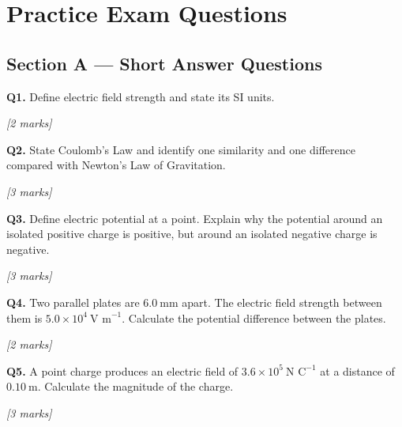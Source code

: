 \section{Practice Exam Questions}

\subsection*{Section A — Short Answer Questions}

\begin{tcolorbox}[colback=white, colframe=midblue, breakable]

\begin{minipage}{\linewidth}
\textbf{Q1.} Define electric field strength and state its SI units.
\par\hfill\textit{[2 marks]}
\vspace{2.5cm}
\end{minipage}

\begin{minipage}{\linewidth}
\textbf{Q2.} State Coulomb's Law and identify one similarity and one difference compared with Newton's Law of Gravitation.
\par\hfill\textit{[3 marks]}
\vspace{3.5cm}
\end{minipage}

\begin{minipage}{\linewidth}
\textbf{Q3.} Define electric potential at a point. Explain why the potential around an isolated positive charge is positive, but around an isolated negative charge is negative.
\par\hfill\textit{[3 marks]}
\vspace{3.5cm}
\end{minipage}

\begin{minipage}{\linewidth}
\textbf{Q4.} Two parallel plates are $6.0\ \text{mm}$ apart. The electric field strength between them is $5.0\times10^4\ \text{V m}^{-1}$. Calculate the potential difference between the plates.
\par\hfill\textit{[2 marks]}
\vspace{2.5cm}
\end{minipage}

\begin{minipage}{\linewidth}
\textbf{Q5.} A point charge produces an electric field of $3.6\times10^5\ \text{N C}^{-1}$ at a distance of $0.10\ \text{m}$. Calculate the magnitude of the charge.
\par\hfill\textit{[3 marks]}
\vspace{3.5cm}
\end{minipage}

\end{tcolorbox}


